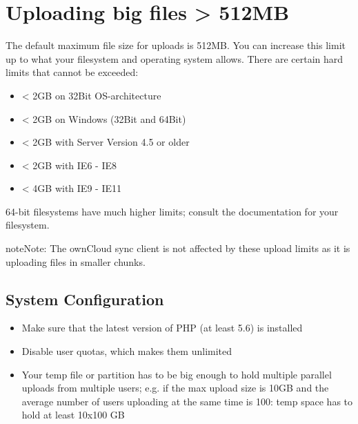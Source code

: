 \documentclass[letterpaper,10pt,english]{sphinxmanual}
\begin{document}
\section{Uploading big files \textgreater{} 512MB}
\label{configuration_files/big_file_upload_configuration::doc}\label{configuration_files/big_file_upload_configuration:uploading-big-files-512mb}
The default maximum file size for uploads is 512MB. You can increase this
limit up to what your filesystem and operating system allows. There are certain
hard limits that cannot be exceeded:
\begin{itemize}
\item {} 
\textless{} 2GB on 32Bit OS-architecture

\item {} 
\textless{} 2GB on Windows (32Bit and 64Bit)

\item {} 
\textless{} 2GB with Server Version 4.5 or older

\item {} 
\textless{} 2GB with IE6 - IE8

\item {} 
\textless{} 4GB with IE9 - IE11

\end{itemize}

64-bit filesystems have much higher limits; consult the documentation for your
filesystem.

\begin{notice}{note}{Note:}
The ownCloud sync client is not affected by these upload limits
as it is uploading files in smaller chunks.
\end{notice}


\subsection{System Configuration}
\label{configuration_files/big_file_upload_configuration:system-configuration}\begin{itemize}
\item {} 
Make sure that the latest version of PHP (at least 5.6) is installed

\item {} 
Disable user quotas, which makes them unlimited

\item {} 
Your temp file or partition has to be big enough to hold multiple
parallel uploads from multiple users; e.g. if the max upload size is 10GB and
the average number of users uploading at the same time is 100: temp space has
to hold at least 10x100 GB

\end{itemize}
\end{document}
